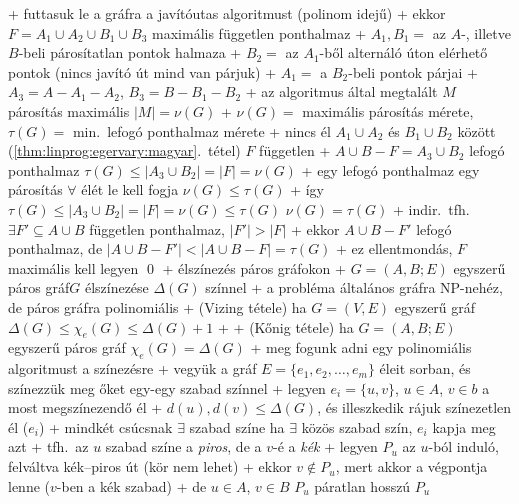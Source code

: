   + futtasuk le a gráfra a javítóutas algoritmust (polinom idejű)
  + \stmnt ekkor $F = A_1 \cup A_2 \cup B_1 \cup B_3$ maximális
    független ponthalmaz
    + $A_1, B_1 =$ az $A$-, illetve $B$-beli párosítatlan pontok
      halmaza
    + $B_2 =$ az $A_1$-ből alternáló úton elérhető pontok (nincs
      javító út \RA mind van párjuk)
    + $A_1 =$ a $B_2$-beli pontok párjai
    + $A_3 = A - A_1 - A_2$, $B_3 = B - B_1 - B_2$
    + \proof az algoritmus által megtalált $M$ párosítás maximális \RA%
      $\lvert M \rvert = \nu(G)$
      + $\nu(G) =$ maximális párosítás mérete, $\tau(G) =$ min.~lefogó
        ponthalmaz mérete
      + nincs él $A_1 \cup A_2$ és $B_1 \cup B_2$ között
        (\ref{thm:linprog:egervary:magyar}.~tétel) \RA $F$ független
      + $A \cup B - F = A_3 \cup B_2$ lefogó ponthalmaz \RA $\tau(G)
        \le \lvert A_3 \cup B_2 \rvert = \lvert F \rvert = \nu(G)$
      + egy lefogó ponthalmaz egy párosítás $\forall$ élét le kell
        fogja \RA $\nu(G) \le \tau(G)$
      + így $\tau(G) \le \lvert A_3 \cup B_2 \rvert = \lvert F \rvert
        = \nu(G) \le \tau(G)$ \RA $\nu(G) = \tau(G)$
    + indir.~tfh.~$\exists F' \subseteq A \cup B$ független
      ponthalmaz, $\lvert F' \rvert > \lvert F \rvert$
      + ekkor $A \cup B - F'$ lefogó ponthalmaz, de $\lvert A \cup B -
        F' \rvert < \lvert A \cup B - F \rvert = \tau(G)$
      + ez ellentmondás, $F$ maximális kell legyen \qed
+ \prob élszínezés páros gráfokon
  + \DataIn $G = (A, B; E)$ egyszerű páros gráf\qquad\DataOut $G$ élszínezése
    $\Delta(G)$ színnel
  + a probléma általános gráfra NP-nehéz, de páros gráfra polinomiális
  + \thm \label{thm:kozelito:additiv:vizing}(Vizing tétele) ha $G = (V, E)$ egyszerű gráf \RA $\Delta(G)
    \le \chi_e(G) \le \Delta(G) + 1$
    + \noproof
  + \thm (Kőnig tétele) ha $G = (A, B; E)$ egyszerű páros gráf \RA%
    $\chi_e(G) = \Delta(G)$
    + \proof meg fogunk adni egy polinomiális algoritmust a színezésre
  + vegyük a gráf $E = \{ e_1, e_2, \ldots, e_m \}$ éleit sorban, és
    színezzük meg őket egy-egy szabad színnel
    + legyen $e_i = \{u, v\}$, $ u \in A$, $v \in b$ a most
      megszínezendő él
    + $d(u), d(v) \le \Delta(G)$, és illeszkedik rájuk színezetlen él
      ($e_i$)
      + \RA mindkét csúcsnak $\exists$ szabad színe \RA ha $\exists$
      közös szabad szín, $e_i$ kapja meg azt
  + tfh.~az $u$ szabad színe a \emph{piros}, de a $v$-é a \emph{kék}
    + legyen $P_u$ az $u$-ból induló, felváltva kék--piros út (kör nem
      lehet)
    + ekkor $v \notin P_u$, mert akkor a végpontja lenne ($v$-ben a
      kék szabad)
      + de $u \in A$, $v \in B$ \RA $P_u$ páratlan hosszú \RA $P_u$
